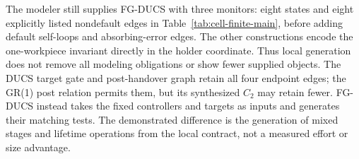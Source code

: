 The modeler still supplies FG-DUCS with three monitors: eight states and eight explicitly listed nondefault edges in Table~\ref{tab:cell-finite-main}, before adding default self-loops and absorbing-error edges. The other constructions encode the one-workpiece invariant directly in the holder coordinate. Thus local generation does not remove all modeling obligations or show fewer supplied objects. The DUCS target gate and post-handover graph retain all four endpoint edges; the GR(1) post relation permits them, but its synthesized $C_2$ may retain fewer. FG-DUCS instead takes the fixed controllers and targets as inputs and generates their matching tests. The demonstrated difference is the generation of mixed stages and lifetime operations from the local contract, not a measured effort or size advantage.
